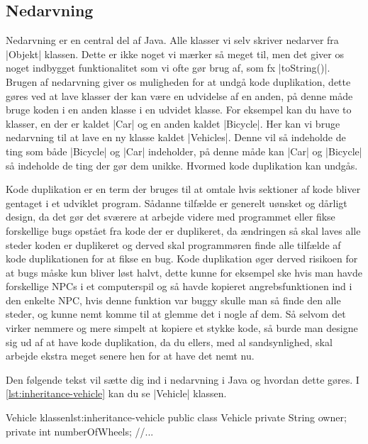 \subsection{Nedarvning}

Nedarvning er en central del af Java. Alle klasser vi selv skriver
nedarver fra \JavaInline|Objekt| klassen. Dette er ikke noget vi
mærker så meget til, men det giver os noget indbygget funktionalitet
som vi ofte gør brug af, som fx \JavaInline|toString()|. Brugen af
nedarvning giver os muligheden for at undgå kode duplikation, dette
gøres ved at lave klasser der kan være en udvidelse af en anden, på
denne måde bruge koden i en anden klasse i en udvidet klasse. For
eksempel kan du have to klasser, en der er kaldet \JavaInline|Car| og
en anden kaldet \JavaInline|Bicycle|. Her kan vi bruge nedarvning til
at lave en ny klasse kaldet \JavaInline|Vehicles|. Denne vil så
indeholde de ting som både \JavaInline|Bicycle| og \JavaInline|Car|
indeholder, på denne måde kan \JavaInline|Car| og \JavaInline|Bicycle|
så indeholde de ting der gør dem unikke. Hvormed kode duplikation kan
undgås.

Kode duplikation er en term der bruges til at omtale hvis sektioner af
kode bliver gentaget i et udviklet program. Sådanne tilfælde er
generelt uønsket og dårligt design, da det gør det sværere at arbejde
videre med programmet eller fikse forskellige bugs opstået fra kode
der er duplikeret, da ændringen så skal laves alle steder koden er
duplikeret og derved skal programmøren finde alle tilfælde af kode
duplikationen for at fikse en bug. Kode duplikation øger derved
risikoen for at bugs måske kun bliver løst halvt, dette kunne for
eksempel ske hvis man havde forskellige NPCs i et computerspil og så
havde kopieret angrebsfunktionen ind i den enkelte NPC, hvis denne
funktion var buggy skulle man så finde den alle steder, og kunne nemt
komme til at glemme det i nogle af dem. Så selvom det virker nemmere
og mere simpelt at kopiere et stykke kode, så burde man designe sig ud
af at have kode duplikation, da du ellers, med al sandsynlighed, skal
arbejde ekstra meget senere hen for at have det nemt nu.

Den følgende tekst vil sætte dig ind i nedarvning i Java og hvordan
dette gøres. I \autoref{lst:inheritance-vehicle} kan du se
\JavaInline|Vehicle| klassen.

\begin{JavaCode}{Vehicle klassen}{lst:inheritance-vehicle}
	public class Vehicle
	{
		private String owner;
		private int numberOfWheels;
		//...
	}
\end{JavaCode}

